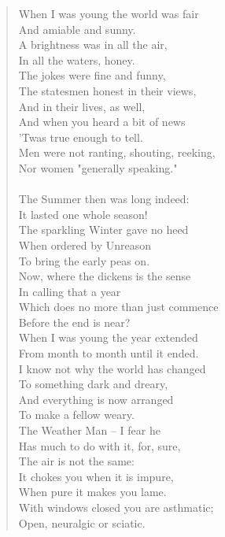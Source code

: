 \documentclass[11pt]{article}
\begin{document}
\begin{quote}   When I was young the world was fair \\
      And amiable and sunny. \\
  A brightness was in all the air, \\
      In all the waters, honey. \\
      The jokes were fine and funny, \\
  The statesmen honest in their views, \\
      And in their lives, as well, \\
  And when you heard a bit of news \\
      'Twas true enough to tell. \\
  Men were not ranting, shouting, reeking, \\
  Nor women "generally speaking." \\
 \\
  The Summer then was long indeed: \\
      It lasted one whole season! \\
  The sparkling Winter gave no heed \\
      When ordered by Unreason \\
      To bring the early peas on. \\
  Now, where the dickens is the sense \\
      In calling that a year \\
  Which does no more than just commence \\
      Before the end is near? \\
  When I was young the year extended \\
  From month to month until it ended. \\
  I know not why the world has changed \\
      To something dark and dreary, \\
  And everything is now arranged \\
      To make a fellow weary. \\
      The Weather Man -- I fear he \\
  Has much to do with it, for, sure, \\
      The air is not the same: \\
  It chokes you when it is impure, \\
      When pure it makes you lame. \\
  With windows closed you are asthmatic; \\
  Open, neuralgic or sciatic. \\

\end{quote}
\end{document}
